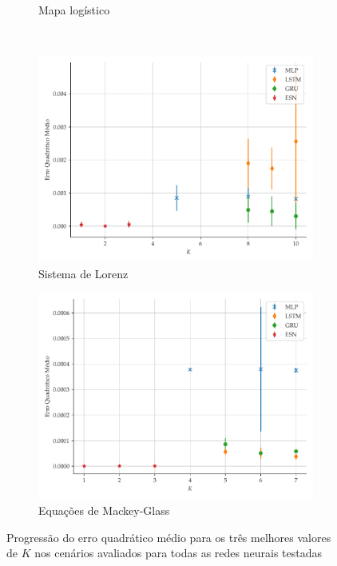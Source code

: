 \documentclass[a4paper, 12pt]{article}
\begin{document}
\begin{figure}[!ht]
\begin{subfigure}[t]{0.45\textwidth}
         \caption{Mapa logístico}
     \end{subfigure}
     \\
     \centering
     \begin{subfigure}[t]{0.45\textwidth}
         \includegraphics[scale=0.4]{lorenz-3best.pdf}
         \caption{Sistema de Lorenz}
     \end{subfigure}
     \centering
     \begin{subfigure}[t]{0.45\textwidth} 
         \includegraphics[scale=0.4]{mackeyglass-3best.pdf}
         \caption{Equações de Mackey-Glass}
     \end{subfigure}  
     \centering   
     \caption{Progressão do erro quadrático médio para os três melhores valores de $K$ nos cenários avaliados para todas as redes neurais testadas}
     \label{fig:mse-progression-3best}
\end{figure}
\end{document}
